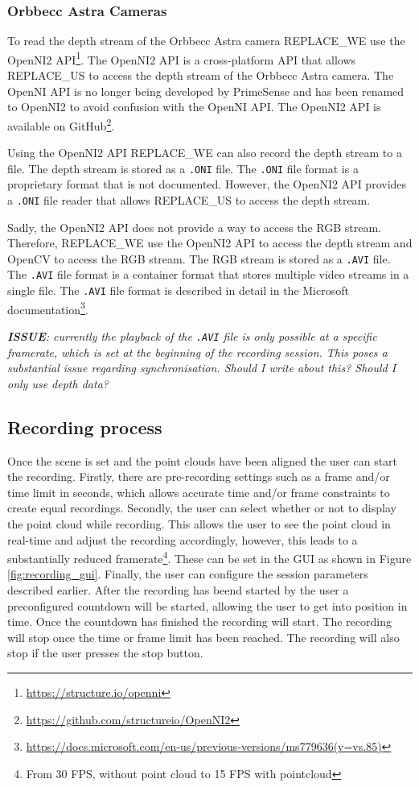 \subsubsection{Orbbecc Astra Cameras}

To read the depth stream of the Orbbecc Astra camera REPLACE_WE use the OpenNI2 API\footnote{\url{https://structure.io/openni}}. The OpenNI2 API is a cross-platform API that allows REPLACE_US to access the depth stream of the Orbbecc Astra camera. The OpenNI API is no longer being developed by PrimeSense and has been renamed to OpenNI2 to avoid confusion with the OpenNI API. The OpenNI2 API is available on GitHub\footnote{\url{https://github.com/structureio/OpenNI2}}.

Using the OpenNI2 API REPLACE_WE can also record the depth stream to a file. The depth stream is stored as a \texttt{.ONI} file. The \texttt{.ONI} file format is a proprietary format that is not documented. However, the OpenNI2 API provides a \texttt{.ONI} file reader that allows REPLACE_US to access the depth stream.

Sadly, the OpenNI2 API does not provide a way to access the RGB stream. Therefore, REPLACE_WE use the OpenNI2 API to access the depth stream and OpenCV to access the RGB stream. The RGB stream is stored as a \texttt{.AVI} file. The \texttt{.AVI} file format is a container format that stores multiple video streams in a single file. The \texttt{.AVI} file format is described in detail in the Microsoft documentation\footnote{\url{https://docs.microsoft.com/en-us/previous-versions/ms779636(v=vs.85)}}. 

\textit{
  \textbf{ISSUE}: currently the playback of the \texttt{.AVI} file is only possible at a specific framerate, which is set at the beginning of the recording session. This poses a substantial issue regarding synchronisation. Should I write about this? Should I only use depth data? 
}

\subsection{Recording process}

Once the scene is set and the point clouds have been aligned the user can start the recording. Firstly, there are pre-recording settings such as a frame and/or time limit in seconds, which allows accurate time and/or frame constraints to create equal recordings. Secondly, the user can select whether or not to display the point cloud while recording. This allows the user to see the point cloud in real-time and adjust the recording accordingly, however, this leads to a substantially reduced framerate\footnote{From 30 FPS, without point cloud to 15 FPS with pointcloud}. These can be set in the GUI as shown in Figure \ref{fig:recording_gui}. Finally, the user can configure the session parameters described earlier. After the recording has beend started by the user a preconfigured countdown will be started, allowing the user to get into position in time. Once the countdown has finished the recording will start. The recording will stop once the time or frame limit has been reached. The recording will also stop if the user presses the stop button.  

